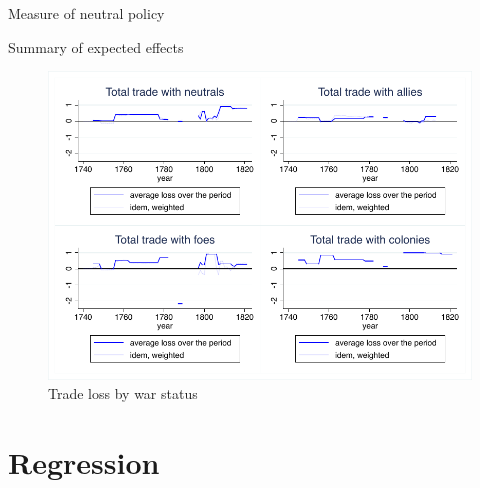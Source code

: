 \documentclass[12pt,a4paper,notitlepage,english]{article}
\begin{document}
\begin{appendix}
\begin{table}[h!]
\centering
\caption{Measure of neutral policy}
\label{neutral_policy}

\end{table}

\begin{table}[ht]
\centering
\caption{Summary of expected effects}
\label{summary}

\end{table}

\begin{center}
\begin{figure}[h!]
\centering
\caption{Trade loss by war status}
\label{loss_by_war_status_XI}
\includegraphics[scale=1.2]{loss_by_war_status_XI.pdf}
\end{figure}
\end{center}



\section{Regression}



\end{appendix}
\end{document}
